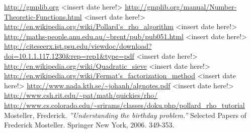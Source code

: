 \documentclass[paper=a4, fontsize=11pt,numbers=endperiod]{scrartcl} %
\numberwithin{equation}{section} %
\numberwithin{figure}{section} %
\numberwithin{table}{section} %
\begin{document}
\newpage
\begin{thebibliography}{9}

\url{http://gmplib.org} <insert date here!>
\url{http://gmplib.org/manual/Number-Theoretic-Functions.html} <insert date here!>
\url{http://en.wikipedia.org/wiki/Pollard's_rho_algorithm} <insert date here!>
\url{http://maths-people.anu.edu.au/~brent/pub/pub051.html} <insert date here!>
\url{http://citeseerx.ist.psu.edu/viewdoc/download?doi=10.1.1.117.1230&rep=rep1&type=pdf} <insert date here!>
\url{http://en.wikipedia.org/wiki/Quadratic_sieve} <insert date here!>
\url{http://en.wikipedia.org/wiki/Fermat's_factorization_method} <insert date here!>
\url{http://www.nada.kth.se/~johanh/algnotes.pdf} <insert date here!>
\url{http://www.csh.rit.edu/~pat/math/quickies/rho/}
\url{http://www.cs.colorado.edu/~srirams/classes/doku.php/pollard_rho_tutorial}
Mosteller, Frederick. \emph{''Understanding the birthday problem.''} Selected Papers of Frederick Mosteller. Springer New York, 2006. 349-353.

\end{thebibliography}
\end{document}
